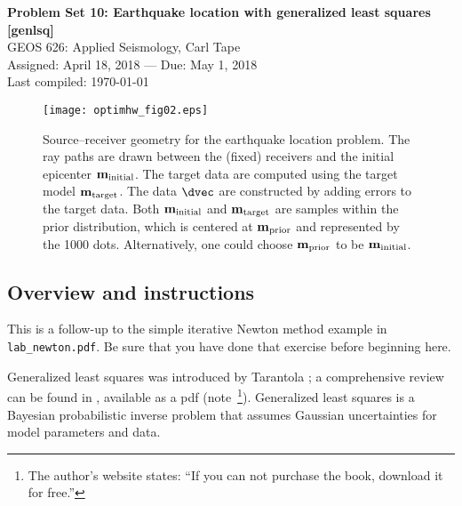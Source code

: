 \documentclass[11pt,titlepage,fleqn]{article}
\begin{document}

\begin{spacing}{1.2}
\centering
{\large \bf Problem Set 10: Earthquake location with generalized least squares [genlsq]} \\
GEOS 626: Applied Seismology, Carl Tape \\
Assigned: April 18, 2018 --- Due: May 1, 2018 \\
Last compiled: \today
\end{spacing}


\vspace{1cm}
\begin{figure}[h]
\centering
\texttt{[image: optimhw\_fig02.eps]}
\caption[Source-receiver geometry]
{{
Source--receiver geometry for the earthquake location problem. The ray paths are drawn between the (fixed) receivers and the initial epicenter $\mbox{${\bf m}$}_{\rm initial}$.
The target data are computed using the target model \textcolor{red}{$\mbox{${\bf m}$}_{\rm target}$}.
The data $\dvec$ are constructed by adding errors to the target data.
Both $\mbox{${\bf m}$}_{\rm initial}$ and $\mbox{${\bf m}$}_{\rm target}$ are samples within the prior distribution, which is centered at \textcolor{blue}{$\mbox{${\bf m}$}_{\rm prior}$} and represented by the 1000 dots. Alternatively, one could choose \textcolor{blue}{$\mbox{${\bf m}$}_{\rm prior}$} to be $\mbox{${\bf m}$}_{\rm initial}$.
\label{fig:srcrec}
}}
\end{figure}


\pagebreak
\subsection*{Overview and instructions}

This is a follow-up to the simple iterative Newton method example in \verb+lab_newton.pdf+. Be sure that you have done that exercise before beginning here.

Generalized least squares was introduced by Tarantola \citep{TarantolaValette1982quest,TarantolaValette1982nonlinear}; a comprehensive review can be found in \citet{Tarantola2005}, available as a pdf (note~\footnote{The author's website states: ``If you can not purchase the book, download it for free.''}). Generalized least squares is a Bayesian probabilistic inverse problem that assumes Gaussian uncertainties for model parameters and data.
\end{document}
